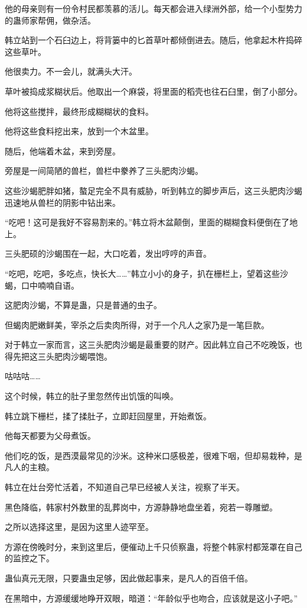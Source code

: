 \begin{this_body}
他的母亲则有一份令村民都羡慕的活儿。每天都会进入绿洲外部，给一个小型势力的蛊师家帮佣，做杂活。

韩立站到一个石臼边上，将背篓中的匕首草叶都倾倒进去。随后，他拿起木杵捣碎这些草叶。

他很卖力。不一会儿，就满头大汗。

草叶被捣成浆糊状后。他取出一个麻袋，将里面的稻壳也往石臼里，倒了小部分。

他将这些搅拌，最终形成糊糊状的食料。

他将这些食料挖出来，放到一个木盆里。

随后，他端着木盆，来到旁屋。

旁屋是一间简陋的兽栏，兽栏中豢养了三头肥肉沙蝎。

这些沙蝎肥胖如猪，螯足完全不具有威胁，听到韩立的脚步声后，这三头肥肉沙蝎迅速地从兽栏的阴影中钻出来。

“吃吧！这可是我好不容易割来的。”韩立将木盆颠倒，里面的糊糊食料便倒在了地上。

三头肥硕的沙蝎围在一起，大口吃着，发出哼哼的声音。

“吃吧，吃吧，多吃点，快长大……”韩立小小的身子，扒在栅栏上，望着这些沙蝎，口中喃喃自语。

这肥肉沙蝎，不算是蛊，只是普通的虫子。

但蝎肉肥嫩鲜美，宰杀之后卖肉所得，对于一个凡人之家乃是一笔巨款。

对于韩立一家而言，这三头肥肉沙蝎是最重要的财产。因此韩立自己不吃晚饭，也得先把这三头肥肉沙蝎喂饱。

咕咕咕……

这个时候，韩立的肚子里忽然传出饥饿的叫唤。

韩立跳下栅栏，揉了揉肚子，立即赶回屋里，开始煮饭。

他每天都要为父母煮饭。

他们吃的饭，是西漠最常见的沙米。这种米口感极差，很难下咽，但却易栽种，是凡人的主粮。

韩立在灶台旁忙活着，不知道自己早已经被人关注，视察了半天。

黑色降临，韩家村外数里的乱葬岗中，方源静静地盘坐着，宛若一尊雕塑。

之所以选择这里，是因为这里人迹罕至。

方源在傍晚时分，来到这里后，便催动上千只侦察蛊，将整个韩家村都笼罩在自己的监控之下。

蛊仙真元无限，只要蛊虫足够，因此做起事来，是凡人的百倍千倍。

在黑暗中，方源缓缓地睁开双眼，暗道：“年龄似乎也吻合，应该就是这小子吧。”


\end{this_body}
